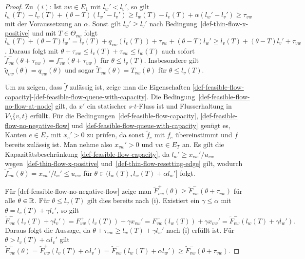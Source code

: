 \begin{proof}
	Zu $(i)$: Ist $vw\in E_1$ mit $l_w'<l_v'$, so gilt
	$l_w(T)-l_v(T) + (\theta - T)(l_w' - l_v') \geq l_w(T)-l_v(T)+\alpha(l_w'- l_v')\geq \tau_{vw}$  mit der Voraussetzung an $\alpha$.
	Sonst gilt $l_w' \geq l_v'$ nach Bedingung~\ref{def-thin-flow-x-positive} und mit $T\in \Theta_{vw}$ folgt $l_w(T)+(\theta-T)l_w'=l_v(T) + q_{vw}(l_v(T))+\tau_{vw}+(\theta - T)l_w' \geq l_v(T) + (\theta-T)l_v'+\tau_{vw}$.
	Daraus folgt mit $\theta + \tau_{vw} \leq l_v(T) + \tau_{vw} \leq l_w(T)$ auch sofort $\tilde{f}_{vw}^-(\theta + \tau_{vw}) = f_{vw}^-(\theta + \tau_{vw})$ für $\theta\leq l_v(T)$.
	Insbesondere gilt $\tilde{q}_{vw}(\theta) = q_{vw}(\theta)$ und sogar $ \tilde{T}_{vw}(\theta)= T_{vw}(\theta)$ für $\theta \leq l_v(T)$.
	
	Um zu zeigen, dass $\tilde{f}$ zulässig ist, zeige man die Eigenschaften \ref{def-feasible-flow-capacity}-\ref{def-feasible-flow-queue-with-capacity}.
	Die Bedingung~\ref{def-feasible-flow-no-flow-at-node} gilt, da $x'$ ein statischer $s$-$t$-Fluss ist und Flusserhaltung in $V\setminus \{ v, t \}$ erfüllt.
	Für die Bedingungen~\ref{def-feasible-flow-capacity}, \ref{def-feasible-flow-no-negative-flow} und \ref{def-feasible-flow-queue-with-capacity} genügt es, Kanten $e\in E_T$ mit $x_e' > 0$ zu prüfen, da sonst $\tilde{f}_e$ mit $f_e$ übereinstimmt und $f$ bereits zulässig ist.
	Man nehme also $x_{vw}' > 0$ und $vw\in E_T$ an.
	Es gilt die Kapazitätsbeschränkung \ref{def-feasible-flow-capacity}, da $l_w'\geq x_{vw}' / u_{vw}$ wegen~\ref{def-thin-flow-x-positive} und~\ref{def-thin-flow-resetting-edge} gilt, wodurch $\tilde{f}^-_{vw}(\theta)=x_{vw}'/l_w'\leq u_{vw}$ für $\theta\in(l_w(T), l_w(T)+\alpha l_w']$ folgt.
	
	Für \ref{def-feasible-flow-no-negative-flow} zeige man $\tilde{F}^+_{vw}(\theta)\geq \tilde{F}_{vw}^-(\theta+\tau_{vw})$ für alle $\theta\in\mathbb{R}$.
	Für $\theta\leq l_v(T)$ gilt dies bereits nach (i).
	Existiert ein $\gamma\leq\alpha$ mit $\theta=l_v(T) + \gamma l_v'$, so gilt
	$$
	\tilde{F}_{vw}^+(l_v(T) + \gamma l_v')=F_{vw}^+(l_v(T))+\gamma x_{vw}' = F_{vw}^-(l_w(T))+ \gamma x_{vw}'= \tilde{F}_{vw}^-(l_w(T)+\gamma l_w').
	$$
	Daraus folgt die Aussage, da $\theta + \tau_{vw}\geq l_w(T) + \gamma l_w'$ nach (i) erfüllt ist.
	Für $\theta > l_v(T)+\alpha l_v'$ gilt $\tilde{F}_{vw}^+(\theta) = \tilde{F}_{vw}^+(l_v(T) + \alpha l_v') = \tilde{F}_{vw}^-(l_w(T) + \alpha l_w') \geq \tilde{F}_{vw}^-(\theta + \tau_{vw})$.
	

\end{proof}
